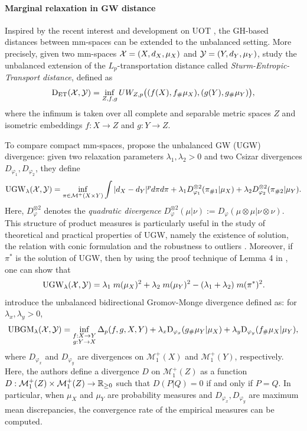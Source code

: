\paragraph{Marginal relaxation in GW distance} Inspired by the recent interest and development
on UOT \citep{Liero18}, the GH-based distances between mm-spaces can be extended to
the unbalanced setting. More precisely, given two mm-spaces
$\mathcal X = (X, d_X, \mu_X)$ and $\mathcal Y = (Y, d_Y, \mu_Y)$, \citep{Ponti20}
study the unbalanced extension of the $L_p$-transportation distance called
\textit{Sturm-Entropic-Transport distance}, defined as
\begin{align}
  \text{D}_{\text{ET}}(\mathcal X, \mathcal Y) =
  \inf_{Z, f, g} UW_{Z, p}\big( (f(X), f_{\#} \mu_X), (g(Y), g_{\#} \mu_Y) \big),
\end{align}
where the infimum is taken over all complete and separable metric spaces $Z$ and
isometric embeddings $f: X \to Z$ and $g: Y \to Z$.

To compare compact mm-spaces,
\citep{Sejourne20} propose the unbalanced GW (UGW) divergence: given two relaxation parameters
$\lambda_1, \lambda_2 > 0$ and two Csizar divergences $D_{\varphi_1}, D_{\varphi_2}$, they define
\begin{align}
  \text{UGW}_{\lambda}(\mathcal X, \mathcal Y) =
  \inf_{ \pi \in \mathcal M^+(X \times Y)} \int |d_X - d_Y|^p d\pi d\pi +
  \lambda_1 D_{\varphi_1}^{\otimes 2}(\pi_{\# 1} | \mu_X) +
  \lambda_2 D_{\varphi_2}^{\otimes 2}(\pi_{\# 2} | \mu_Y).
\end{align}
Here, $D_{\varphi}^{\otimes 2}$ denotes the \textit{quadratic divergence}
$D_{\varphi}^{\otimes 2}(\mu | \nu) := D_{\varphi}(\mu \otimes \mu | \nu \otimes \nu)$.
This structure of product measures is particularly useful in the study of theoretical
and practical properties of UGW, namely the existence of solution,
the relation with conic formulation \citep{Sejourne20} and the robustness to outliers \citep{Tran23}.
Moreover, if $\pi^*$ is the solution of UGW, then by using the proof technique of
Lemma 4 in \citep{Khiem20}, one can show that
\begin{align}
  \label{eq:ugw_minimizer_minimum}
  \text{UGW}_{\lambda}(\mathcal X, \mathcal Y) = \lambda_1 \; m(\mu_X)^2 + \lambda_2 \; m(\mu_Y)^2
  - (\lambda_1 + \lambda_2) \; m(\pi^*)^2.
\end{align}
\citep{Zhang21} introduce the unbalanced bidirectional Gromov-Monge divergence defined as:
for $\lambda_x, \lambda_y > 0$,
\begin{align}
    \text{UBGM}_{\lambda}(\mathcal X, \mathcal Y) = \inf_{\substack{f: X \to Y \\ g: Y \to X}}
  \Delta_p(f,g, X, Y) + \lambda_x \text{D}_{\varphi_x}(g_{\#} \mu_Y | \mu_X)
  + \lambda_y \text{D}_{\varphi_y}(f_{\#}\mu_X | \mu_Y),
\end{align}
where $D_{\varphi_x}$ and $D_{\varphi_y}$ are divergences on $\mathcal M^+_1(X)$ and $\mathcal M^+_1(Y)$,
respectively. Here, the authors define a divergence $D$ on $\mathcal M^+_1(Z)$ as a function
$D: \mathcal M^+_1(Z) \times \mathcal M^+_1(Z) \to \mathbb R_{\geq 0}$ such that
$D(P | Q) = 0$ if and only if $P = Q$. In particular, when $\mu_X$ and $\mu_Y$
are probability measures and $D_{\varphi_x}, D_{\varphi_y}$ are maximum mean discrepancies,
the convergence rate of the empirical measures can be computed.

